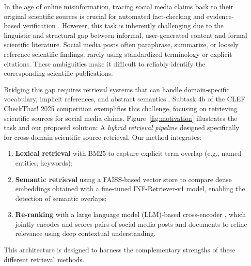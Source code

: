 %
%
In the age of online misinformation, tracing social media claims back to their original scientific sources is crucial for automated fact-checking and evidence-based verification \cite{bruggemann_post-normal_2020, alam_fighting_2021}. However, this task is inherently challenging due to the linguistic and structural gap between informal, user-generated content and formal scientific literature. Social media posts often paraphrase, summarize, or loosely reference scientific findings, rarely using standardized terminology or explicit citations. These ambiguities make it difficult to reliably identify the corresponding scientific publications.

Bridging this gap requires retrieval systems that can handle domain-specific vocabulary, implicit references, and abstract semantics \cite{alam_fighting_2021}. Subtask 4b of the CLEF CheckThat! 2025 competition \cite{hauff_clef-2025_2025, clef-checkthat:2025-lncs, clef-checkthat:2025:task4} exemplifies this challenge, focusing on retrieving scientific sources for social media claims.
%
Figure~\ref{fig:motivation} illustrates the task and our proposed solution: A \emph{hybrid retrieval pipeline} designed specifically for cross-domain scientific source retrieval. Our method integrates:

\begin{enumerate}
    \item \textbf{Lexical retrieval} with BM25 \cite{robertson_relevance_1976, robertson_probabilistic_2009} to capture explicit term overlap (e.g., named entities, keywords);
    \item \textbf{Semantic retrieval} using a FAISS-based \cite{johnson_billion-scale_2021, douze_faiss_2024} vector store to compare dense embeddings obtained with a fine-tuned INF-Retriever-v1 \cite{infly-ai_inf-retriever-v1_nodate} model, enabling the detection of semantic overlaps;
    \item \textbf{Re-ranking} with a large language model (LLM)-based cross-encoder \cite{li_making_2023, chen_m3-embedding_2024}, which jointly encodes and scores pairs of social media posts and documents to refine relevance using deep contextual understanding.
\end{enumerate}

This architecture is designed to harness the complementary strengths of these different retrieval methods.


